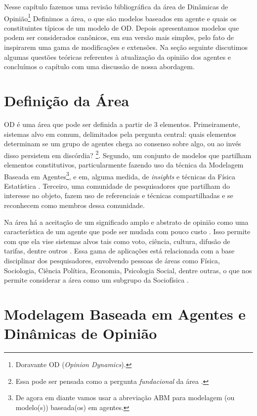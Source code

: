 Nesse capítulo fazemos uma revisão bibliográfica da área de Dinâmicas de
Opinião\footnote{Doravante OD (\textit{Opinion Dynamics}).} Definimos a área, o
que são modelos baseados em agente e quais os constituintes típicos de um modelo
de OD. Depois apresentamos modelos que podem ser considerados canônicos, em sua
versão mais simples, pelo fato de inspirarem uma gama de modificações e
extensões. Na seção seguinte discutimos algumas questões teóricas referentes à
atualização da opinião dos agentes e concluímos o capítulo com uma discussão de
nossa abordagem.


\section{Definição da Área}

OD é uma área que pode ser definida a partir de 3 elementos. Primeiramente,
sistemas alvo em comum, delimitados pela pergunta central: quais elementos
determinam se um grupo de agentes chega ao consenso sobre algo, ou ao invés
disso persistem em discórdia? \cite{castellano2012social}\footnote{Essa pode ser
  pensada como a pergunta \textit{fundacional} da área \cite{flache2017}.}.
Segundo, um conjunto de modelos que partilham elementos constitutivos,
particularmente fazendo uso da técnica da Modelagem Baseada em
Agentes\footnote{De agora em diante vamos usar a abreviação ABM para modelagem
  (ou modelo(s)) baseada(os) em agentes.}, e em, alguma medida, de
\textit{insights} e técnicas da Física Estatística \cite{galam1990social}.
Terceiro, uma comunidade de pesquisadores que partilham do interesse no objeto,
fazem uso de referenciais e técnicas compartilhadas e se reconhecem como membros
dessa comunidade.

Na área há a aceitação de um significado amplo e abstrato de opinião como uma
característica de um agente que pode ser mudada com pouco custo
\cite[p.312]{castellano2012social}. Isso permite com que ela vise sistemas alvos
tais como voto, ciência, cultura, difusão de tarifas, dentre outros
\cite{kowalska2013going,martins2015thou,axelrod1997dissemination,galam1990social}.
Essa gama de aplicações está relacionada com a base disciplinar dos pesquisadores,
envolvendo pessoas de áreas como Física, Sociologia, Ciência Política, Economia,
Psicologia Social, dentre outras, o que nos permite considerar a área como um
subgrupo da Sociofísica \cite{galam1982sociophysics,galam2012sociophysics}.


\section{Modelagem Baseada em Agentes e Dinâmicas de Opinião}

